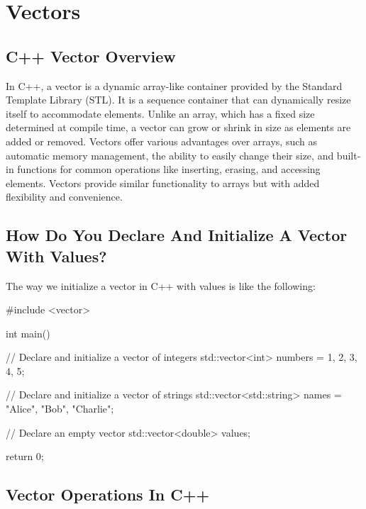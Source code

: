 \section*{Vectors}

\subsection*{C++ Vector Overview}

In C++, a vector is a dynamic array-like container provided by the Standard Template Library (STL). It is a sequence container that can dynamically resize itself to accommodate elements. Unlike an 
array, which has a fixed size determined at compile time, a vector can grow or shrink in size as elements are added or removed. Vectors offer various advantages over arrays, such as automatic memory 
management, the ability to easily change their size, and built-in functions for common operations like inserting, erasing, and accessing elements. Vectors provide similar functionality to arrays but 
with added flexibility and convenience.

\subsection*{How Do You Declare And Initialize A Vector With Values?}

\begin{highlight}

The way we initialize a vector in C++ with values is like the following:

\begin{code}
#include <vector>

int main() {
    // Declare and initialize a vector of integers
    std::vector<int> numbers = {1, 2, 3, 4, 5};

    // Declare and initialize a vector of strings
    std::vector<std::string> names = {"Alice", "Bob", "Charlie"};

    // Declare an empty vector
    std::vector<double> values;

    return 0;
}
\end{code}

\end{highlight}

\subsection*{Vector Operations In C++}

